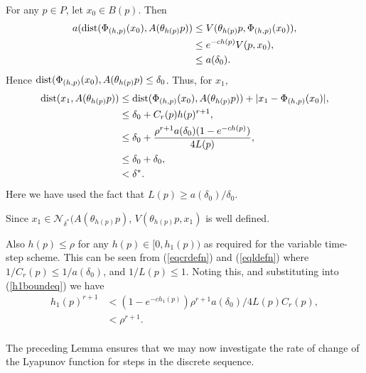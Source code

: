 \begin{prf}
For any $p \in P$, let $x_0 \in B(p)$. Then
\begin{align}
  a({\rm dist}(\Phi_{(h, p)}(x_0), A( \theta_{h(p)}p) ) &\leq V( \theta_{h(p)}p,
                        \Phi_{(h, p)}(x_0)), \nonumber \\
         & \leq e^{-ch(p)}V(p, x_0), \nonumber \\
         & \leq a( \delta_0 ). \label{lemvnhoodref}
\end{align}
Hence ${\rm dist}(\Phi_{(h, p)}(x_0), A( \theta_{h(p)}p) \leq
\delta_0$. Thus, for $x_1$,
\begin{align*}
  {\rm dist}(x_1,A(\theta_{h(p)}p)) &\leq {\rm dist}(\Phi_{(h, p)}(x_0),A(\theta_{h(p)}p))
                          + | x_1 - \Phi_{(h, p)}(x_0)|, \\
           & \leq \delta_0 + C_r(p)h(p)^{r + 1}, \\
           & \leq \delta_0 + \frac{\rho^{r+1} a(\delta_0) (1 - e^{-ch(p)})}
                   {4L(p)}, \\
           & \leq \delta_0 + \delta_0, \\
           & < \delta^*.
\end{align*}
Here we have used the fact that $L(p) \geq a(\delta_0)/\delta_0$.

Since $x_1 \in \mathcal{N}_{\delta^*} (A(\theta_{h(p)}p)$, $V(\theta_{h(p)}p,
x_1)$ is well defined.

Also $h(p) \leq \rho$ for any $h(p) \in [0, h_1(p))$ as required
for the variable time-step scheme. This can be seen from
(\ref{eqcrdefn}) and (\ref{eqldefn}) where $1/C_r(p) \leq 1 /
a(\delta_0)$, and $1/L(p) \leq 1$. Noting this, and substituting
into (\ref{h1boundeq}) we have
\begin{align*}
  h_1(p)^{r+1} &< (1 - e^{-ch_1(p)})\rho^{r+1}a(\delta_0) /
            4L(p)C_r(p), \\
  &< \rho^{r+1}. \\
\end{align*}
\end{prf}

The preceding Lemma ensures that we may now investigate the rate
of change of the Lyapunov function for steps in the discrete
sequence.

